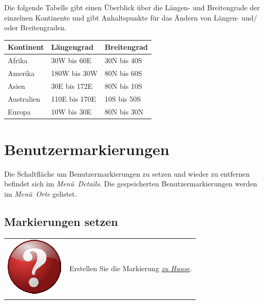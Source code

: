 \documentclass[10pt]{scrreprt}
\newcommand{\textref}[1]{\mbox{\raisebox{0.1ex}{\small$\rightarrow$ }\textit{#1}}}
\begin{document}
\vspace{5mm}
Die folgende Tabelle gibt einen Überblick über die Längen- und Breitengrade der einzelnen Kontinente und gibt Anhaltspunkte für das Ändern von Längen- und/ oder Breitengraden.

\vspace{3mm}
\begin{center}
\begin{tabular}{|>{\centering \arraybackslash}p{3cm}|>{\centering \arraybackslash}p{3cm}|>{\centering \arraybackslash}p{3cm}|}
\hline 
\rule[-1ex]{0pt}{4ex} \textbf{Kontinent} & \textbf{Längengrad} & \textbf{Breitengrad} \\ 
\hline
\hline
\rule[-1ex]{0pt}{4ex} Afrika & 30W bis 60E & 30N bis 40S\\
\hline
\rule[-1ex]{0pt}{4ex} Amerika & 180W bis 30W & 80N bis 60S \\
\hline
\rule[-1ex]{0pt}{4ex} Asien & 30E bis 172E & 80N bis 10S \\
\hline
\rule[-1ex]{0pt}{4ex} Australien & 110E bis 170E & 10S bis 50S \\
\hline
\rule[-1ex]{0pt}{4ex} Europa & 10W bis 30E & 80N bis 30N \\
\hline
\end{tabular}
\end{center}






\newpage
\section{Benutzermarkierungen} 
Die Schaltfläche um Benutzermarkierungen zu setzen und wieder zu entfernen befindet sich im \textref{Menü Details}. Die gespeicherten Benutzermarkierungen werden im \textref{Menü Orte} gelistet.





\vspace{3mm}
\subsection{Markierungen setzen}  



\vspace{3mm}
\begin{tabular}{>{\centering \arraybackslash}m{1cm} m{14cm}}
\includegraphics[scale=0.5]{images/quest.eps} & Erstellen Sie die Markierung  \underline{\textit{zu Hause}}.
\end{tabular}
\end{document}
